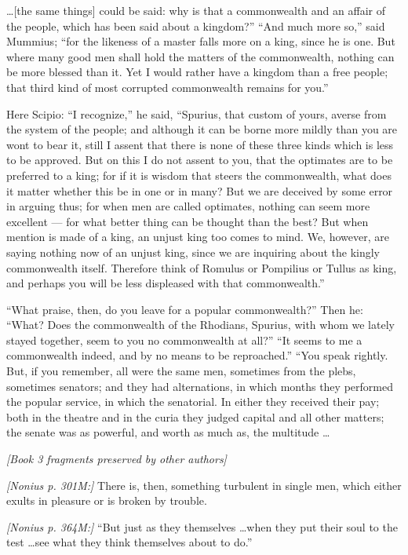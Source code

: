  \ldots [the same things] could be said: why is that a commonwealth and an affair of the people, which has been said about a kingdom?'' ``And much more so,'' said Mummius; ``for the likeness of a master falls more on a king, since he is one. But where many good men shall hold the matters of the commonwealth, nothing can be more blessed than it. Yet I would rather have a kingdom than a free people; that third kind of most corrupted commonwealth remains for you.''

 Here Scipio: ``I recognize,'' he said, ``Spurius, that custom of yours, averse from the system of the people; and although it can be borne more mildly than you are wont to bear it, still I assent that there is none of these three kinds which is less to be approved. But on this I do not assent to you, that the optimates are to be preferred to a king; for if it is wisdom that steers the commonwealth, what does it matter whether this be in one or in many? But we are deceived by some error in arguing thus; for when men are called optimates, nothing can seem more excellent --- for what better thing can be thought than the best? But when mention is made of a king, an unjust king too comes to mind. We, however, are saying nothing now of an unjust king, since we are inquiring about the kingly commonwealth itself. Therefore think of Romulus or Pompilius or Tullus as king, and perhaps you will be less displeased with that commonwealth.''

 ``What praise, then, do you leave for a popular commonwealth?'' Then he: ``What? Does the commonwealth of the Rhodians, Spurius, with whom we lately stayed together, seem to you no commonwealth at all?'' ``It seems to me a commonwealth indeed, and by no means to be reproached.'' ``You speak rightly. But, if you remember, all were the same men, sometimes from the plebs, sometimes senators; and they had alternations, in which months they performed the popular service, in which the senatorial. In either they received their pay; both in the theatre and in the curia they judged capital and all other matters; the senate was as powerful, and worth as much as, the multitude \ldots

\bigskip
\noindent\textit{[Book 3 fragments preserved by other authors]}

 \textit{[Nonius p. 301M:]} There is, then, something turbulent in single men, which either exults in pleasure or is broken by trouble.

 \textit{[Nonius p. 364M:]} ``But just as they themselves \ldots when they put their soul to the test \ldots see what they think themselves about to do.''

